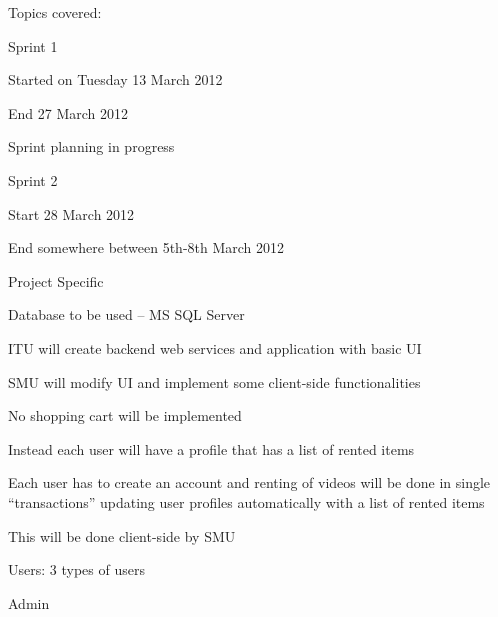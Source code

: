 Topics covered:
\begin{my_itemize}
\item Sprint 1

	\begin{my_itemize}
	\item Started on Tuesday 13 March 2012

	\item End 27 March 2012

	\item Sprint planning in progress
	\end{my_itemize}

\item Sprint 2

	\begin{my_itemize}
	\item Start 28 March 2012
	
	\item End somewhere between 5th-8th March 2012
	\end{my_itemize}

\item Project Specific

	\begin{my_itemize}
	\item Database to be used – MS SQL Server

	\item ITU will create backend web services and application with basic UI

	\item SMU will modify UI and implement some client-side functionalities

	\item No shopping cart will be implemented

		\begin{my_itemize}
		\item Instead each user will have a profile that has a list of rented items
			
		\item Each user has to create an account and renting of videos will be done in single “transactions” updating user profiles automatically with a list of rented items

		\item This will be done client-side by SMU
		\end{my_itemize}

	\item Users: 3 types of users

		\begin{my_itemize}
		\item Admin
			

\end{my_itemize}
\end{my_itemize}
\end{my_itemize}
